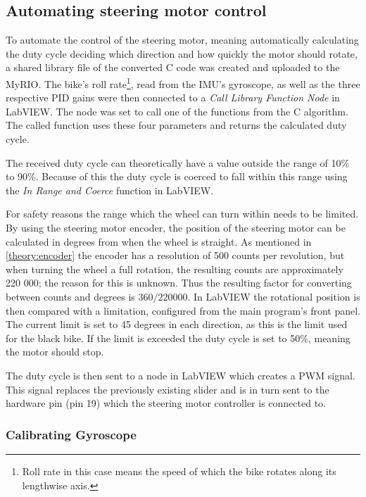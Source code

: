 \subsection{Automating steering motor control}

To automate the control of the steering motor, meaning automatically calculating the duty cycle deciding which direction and how quickly the motor should rotate, a shared library file of the converted C code was created and uploaded to the MyRIO. The bike's roll rate\footnote{Roll rate in this case means the speed of which the bike rotates along its lengthwise axis.}, read from the IMU's gyroscope, as well as the three respective PID gains were then connected to a \textit{Call Library Function Node} in LabVIEW. The node was set to call one of the functions from the C algorithm. The called function uses these four parameters and returns the calculated duty cycle.

The received duty cycle can theoretically have a value outside the range of 10\% to 90\%. Because of this the duty cycle is coerced to fall within this range using the \textit{In Range and Coerce} function in LabVIEW.

For safety reasons the range which the wheel can turn within needs to be limited. By using the steering motor encoder, the position of the steering motor can be calculated in degrees from when the wheel is straight. As mentioned in \ref{theory:encoder} the encoder has a resolution of 500 counts per revolution, but when turning the wheel a full rotation, the resulting counts are approximately 220 000; the reason for this is unknown. Thus the resulting factor for converting between counts and degrees is $360 / 220000$. In LabVIEW the rotational position is then compared with a limitation, configured from the main program's front panel. The current limit is set to 45 degrees in each direction, as this is the limit used for the black bike. If the limit is exceeded the duty cycle is set to 50\%, meaning the motor should stop.
 
The duty cycle is then sent to a node in LabVIEW which creates a PWM signal. This signal replaces the previously existing slider and is in turn sent to the hardware pin (pin 19) which the steering motor controller is connected to.

\subsubsection{Calibrating Gyroscope}

